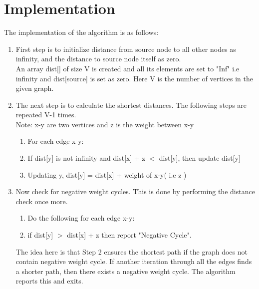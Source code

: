 \documentclass[12pt]{article}
\begin{document}
\section{Implementation}
The implementation of the algorithm is as follows:
\begin{enumerate}
	\item First step is to initialize distance from source node to all other nodes as infinity, and the distance to source node itself as zero. \\
	An array dist[] of size V is created and all its elements are set to "Inf" i.e infinity and dist[source] is set as zero. Here V is the number of vertices in the given graph.
	
	\item The next step is to calculate the shortest distances. The following steps are repeated V-1 times. \\
	Note: x-y are two vertices and  z is the weight between x-y
	\begin{enumerate}
		\item For each edge x-y:
		\item If dist[y] is not infinity and dist[x] + z $<$ dist[y], then update dist[y]
		\item Updating y, dist[y] = dist[x] + weight of x-y( i.e z )  
	\end{enumerate}
	
	\item Now check for negative weight cycles. This is done by performing the distance check once more.
	\begin{enumerate}
		\item Do the following for each edge x-y:
		\item if dist[y] $>$ dist[x] + z then report "Negative Cycle".  
	\end{enumerate}
	The idea here is that Step 2 ensures the shortest path if the graph does not contain negative weight cycle. If another iteration through all the edges finds a shorter path, then there exists a negative weight cycle. The algorithm reports this and exits.
\end{enumerate}
\end{document}
